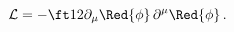 \begin{equation}
  {\cal L}=-\ft12 \partial _\mu \Red{\phi}\,\partial ^ \mu\Red{\phi}\,.
 \label{Lscalar}
\end{equation}

